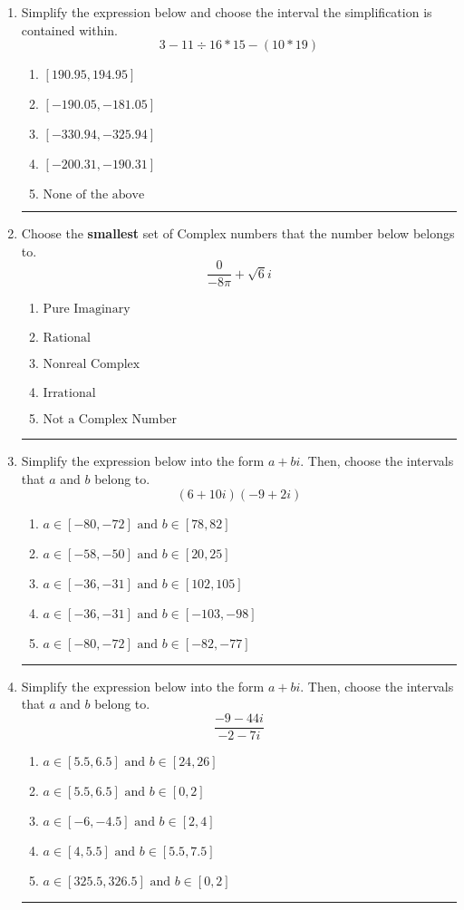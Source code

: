 \documentclass[14pt]{extbook}
\newcommand{\litem}[1]{\item#1\hspace*{-1cm}\rule{\textwidth}{0.4pt}}
\begin{document}
\begin{enumerate}
{\begin{enumerate}[label=\Alph*.]
\end{enumerate} }
\litem{
Simplify the expression below and choose the interval the simplification is contained within.\[ 3 - 11 \div 16 * 15 - (10 * 19) \]\begin{enumerate}[label=\Alph*.]
\item \( [190.95, 194.95] \)
\item \( [-190.05, -181.05] \)
\item \( [-330.94, -325.94] \)
\item \( [-200.31, -190.31] \)
\item \( \text{None of the above} \)

\end{enumerate} }
\litem{
Choose the \textbf{smallest} set of Complex numbers that the number below belongs to.\[ \frac{0}{-8 \pi}+\sqrt{6}i \]\begin{enumerate}[label=\Alph*.]
\item \( \text{Pure Imaginary} \)
\item \( \text{Rational} \)
\item \( \text{Nonreal Complex} \)
\item \( \text{Irrational} \)
\item \( \text{Not a Complex Number} \)

\end{enumerate} }
\litem{
Simplify the expression below into the form $a+bi$. Then, choose the intervals that $a$ and $b$ belong to.\[ (6 + 10 i)(-9 + 2 i) \]\begin{enumerate}[label=\Alph*.]
\item \( a \in [-80, -72] \text{ and } b \in [78, 82] \)
\item \( a \in [-58, -50] \text{ and } b \in [20, 25] \)
\item \( a \in [-36, -31] \text{ and } b \in [102, 105] \)
\item \( a \in [-36, -31] \text{ and } b \in [-103, -98] \)
\item \( a \in [-80, -72] \text{ and } b \in [-82, -77] \)

\end{enumerate} }
\litem{
Simplify the expression below into the form $a+bi$. Then, choose the intervals that $a$ and $b$ belong to.\[ \frac{-9 - 44 i}{-2 - 7 i} \]\begin{enumerate}[label=\Alph*.]
\item \( a \in [5.5, 6.5] \text{ and } b \in [24, 26] \)
\item \( a \in [5.5, 6.5] \text{ and } b \in [0, 2] \)
\item \( a \in [-6, -4.5] \text{ and } b \in [2, 4] \)
\item \( a \in [4, 5.5] \text{ and } b \in [5.5, 7.5] \)
\item \( a \in [325.5, 326.5] \text{ and } b \in [0, 2] \)


\end{enumerate}}
\end{enumerate}
\end{document}
